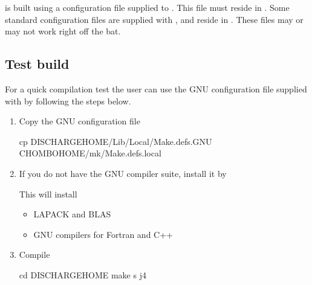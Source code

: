 \documentclass[letterpaper,10pt,english]{sphinxmanual}
\begin{document}
 is built using a configuration file supplied to .
This file must reside in .
Some standard configuration files are supplied with , and reside in .
These files may or may not work right off the bat.


\subsection{Test build}
\label{\detokenize{Base/Installation:test-build}}
For a quick compilation test the user can use the GNU configuration file supplied with  by following the steps below.
\begin{enumerate}
%
\item {} 
Copy the GNU configuration file

\begin{sphinxVerbatim}[commandchars=\\\{\},formatcom=\scriptsize]
cp \PYGZdl{}DISCHARGE\PYGZus{}HOME/Lib/Local/Make.defs.GNU \PYGZdl{}CHOMBO\PYGZus{}HOME/mk/Make.defs.local
\end{sphinxVerbatim}

\item {} 
If you do not have the GNU compiler suite, install it by

\begin{sphinxVerbatim}[commandchars=\\\{\},formatcom=\scriptsize]
       
\end{sphinxVerbatim}

This will install
\begin{itemize}
\item {} 
LAPACK and BLAS

\item {} 
GNU compilers for Fortran and C++

\end{itemize}

\item {} 
Compile 

\begin{sphinxVerbatim}[commandchars=\\\{\},formatcom=\scriptsize]
cd \PYGZdl{}DISCHARGE\PYGZus{}HOME
make \PYGZhy{}s \PYGZhy{}j4
\end{sphinxVerbatim}

\end{enumerate}
\end{document}
